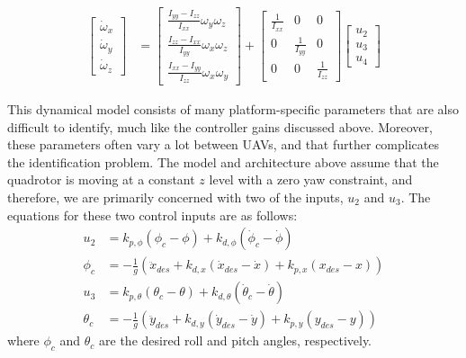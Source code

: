 \documentclass[letterpaper, 10 pt, conference]{ieeeconf}  %
\begin{document}
\begin{equation}
\begin{aligned}
	\begin{bmatrix}\dot{\omega}_{x} \\ \dot{\omega}_{y} \\ \dot{\omega}_{z}\end{bmatrix} &= \begin{bmatrix}\frac{I_{yy} - I_{zz}}{I_{xx}} \omega_{y}\omega_{z}\\ \frac{I_{zz} - I_{xx}}{I_{yy}} \omega_{x}\omega_{z} \\ \frac{I_{xx} - I_{yy}}{I_{zz}} \omega_{x}\omega_{y} \end{bmatrix} +  \begin{bmatrix}\frac{1}{I_{xx}} & 0 & 0\\ 0 & \frac{1}{I_{yy}} & 0\\ 0 & 0 & \frac{1}{I_{zz}}\end{bmatrix} \begin{bmatrix}u_{2} \\ u_{3} \\ u_{4} \end{bmatrix}
	\end{aligned}
\end{equation} 

This dynamical model consists of many platform-specific parameters that are also difficult to identify, much like the controller gains discussed above. Moreover, these parameters often vary a lot between UAVs, and that further complicates the identification problem. The model and architecture above assume that the quadrotor is moving at a constant $z$ level with a zero yaw constraint, and therefore, we are primarily concerned with two of the inputs, $u_2$ and $u_3$. The equations for these two control inputs are as follows:
\begin{align} \label{eq:cinputs}
    u_2 &= k_{p,\phi}(\phi_c-\phi) + k_{d,\phi}(\dot{\phi}_c - \dot{\phi}) \nonumber \\
    \phi_c &= -\frac{1}{g}(\ddot{x}_{des} + k_{d,x}(\dot{x}_{des}-\dot{x}) + k_{p,x}(x_{des}-x)) \nonumber \\
    u_3 &= k_{p,\theta}(\theta_c-\theta) + k_{d,\theta}(\dot{\theta}_c - \dot{\theta}) \nonumber \\
    \theta_c &= -\frac{1}{g}(\ddot{y}_{des} + k_{d,y}(\dot{y}_{des}-\dot{y}) + k_{p,y}(y_{des}-y))
\end{align}
where $\phi_c$ and $\theta_c$ are the desired roll and pitch angles, respectively.
\end{document}
